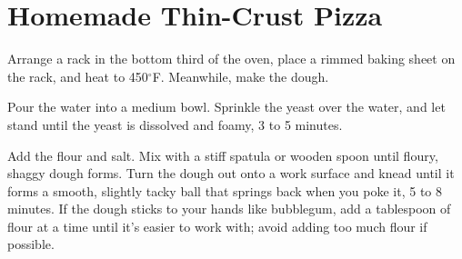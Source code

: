 \section{Homemade Thin-Crust Pizza}
\begin{recipe}




	Arrange a rack in the bottom third of the oven, place a rimmed baking sheet on the rack, and heat to 450$^{\circ}$F. Meanwhile, make the dough.

	Pour the water into a medium bowl. Sprinkle the yeast over the water, and let stand until the yeast is dissolved and foamy, 3 to 5 minutes.

	Add the flour and salt. Mix with a stiff spatula or wooden spoon until floury, shaggy dough forms. Turn the dough out onto a work surface and knead until it forms a smooth, slightly tacky ball that springs back when you poke it, 5 to 8 minutes. If the dough sticks to your hands like bubblegum, add a tablespoon of flour at a time until it’s easier to work with; avoid adding too much flour if possible.


\end{recipe}

